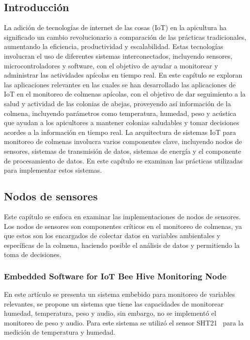 \subsection{Introducción}
La adición de tecnologías de internet de las cosas (IoT) en la apicultura ha significado un cambio revolucionario a comparación de las prácticas tradicionales, aumentando la eficiencia, productividad y escalabilidad. Estas tecnologías involucran el uso de diferentes sistemas interconectados, incluyendo sensores, microcontroladores y software, con el objetivo de ayudar a monitorear y administrar las actividades apícolas en tiempo real.
En este capítulo se exploran las aplicaciones relevantes en las cuales se han desarrollado las aplicaciones de IoT en el monitoreo de colmenas apícolas, con el objetivo de dar seguimiento a la salud y actividad de las colonias de abejas, proveyendo así información de la colmena, incluyendo parámetros como temperatura, humedad, peso y acústica que ayudan a los apicultores a mantener colonias saludables y tomar decisiones acordes a la información en tiempo real.
La arquitectura de sistemas IoT para monitoreo de colmenas involucra varios componentes clave, incluyendo nodos de sensores, sistemas de transmisión de datos, sistemas de energía y el componente de procesamiento de datos. En este capítulo se examinan las prácticas utilizadas para implementar estos sistemas.

\subsection{Nodos de sensores}
Este capítulo se enfoca en examinar las implementaciones de nodos de sensores. Los nodos de sensores son componentes críticos en el monitoreo de colmenas, ya que estos son los encargados de colectar datos en variables ambientales y específicas de la colmena, haciendo posible el análisis de datos y permitiendo la toma de decisiones.

\subsubsection{Embedded Software for IoT Bee Hive Monitoring Node}
En este artículo se presenta un sistema embebido para monitoreo de variables relevantes, se propone un sistema que tiene las capacidades de monitorear humedad, temperatura, peso y audio, sin embargo, no se implementó el monitoreo de peso y audio. Para este sistema se utilizó el sensor SHT21~\cite{sht21} para la medición de temperatura y humedad.~\cite{vidrascu_svasta_2017a}

